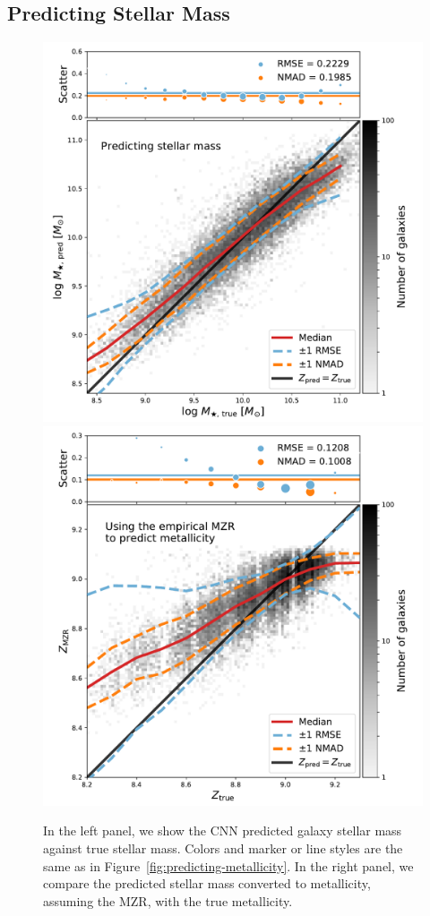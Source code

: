 \documentclass[fleqn,usenatbib]{mnras}
\begin{document}
\subsection{Predicting Stellar Mass}

\begin{figure}
	\includegraphics[width=\columnwidth]{05-a-prediction_mass.pdf}
	\includegraphics[width=\columnwidth]{05-b-prediction_mzr.pdf}
	\caption{\label{fig:mass-metallicity}
		In the left panel, we show the CNN predicted galaxy stellar mass against true stellar mass. Colors and marker or line styles are the same as in Figure~\ref{fig:predicting-metallicity}. In the right panel, we compare the predicted stellar mass converted to metallicity, assuming the \citealt{Tremonti2004} MZR, with the true metallicity.
		}
\end{figure}
\end{document}

